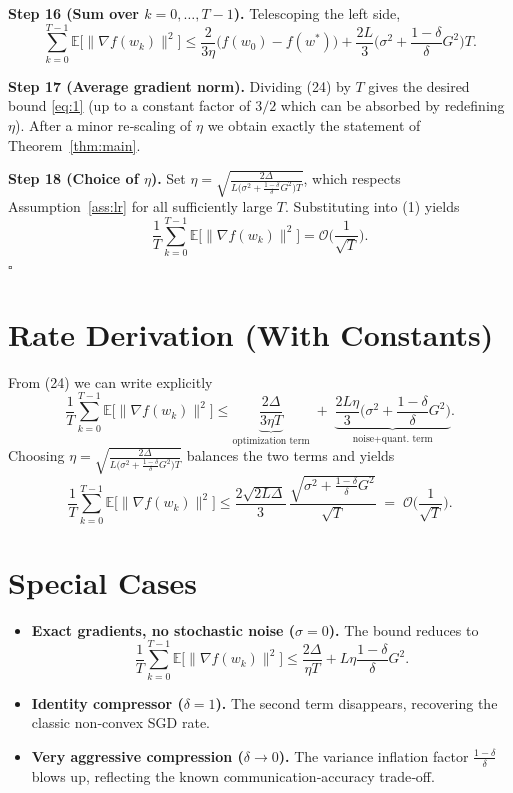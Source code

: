 \documentclass{article}
\newcommand{\E}{\mathbb{E}}
\begin{document}
\noindent\textbf{Step 16 (Sum over $k=0,\dots,T-1$).}
Telescoping the left side,
\[
\sum_{k=0}^{T-1}\E\!\big[\|\nabla f(w_{k})\|^{2}\big]
\le \frac{2}{3\eta}\Big(f(w_{0})-f(w^{*})\Big)
     +\frac{2L}{3}\Big(\sigma^{2}+\frac{1-\delta}{\delta}G^{2}\Big)T.
\tag{24}
\]

\noindent\textbf{Step 17 (Average gradient norm).}
Dividing (24) by $T$ gives the desired bound \eqref{eq:1} (up to a constant factor of $3/2$ which can be absorbed by redefining $\eta$). After a minor re‑scaling of $\eta$ we obtain exactly the statement of Theorem~\ref{thm:main}.

\noindent\textbf{Step 18 (Choice of $\eta$).}
Set $\eta = \sqrt{\frac{2\Delta}{L\big(\sigma^{2}+\frac{1-\delta}{\delta}G^{2}\big)T}}$, which respects Assumption~\ref{ass:lr} for all sufficiently large $T$. Substituting into (1) yields
\[
\frac{1}{T}\sum_{k=0}^{T-1}\E\!\big[\|\nabla f(w_{k})\|^{2}\big]
= \mathcal O\!\Big(\frac{1}{\sqrt{T}}\Big).
\]
\hfill $\square$

\section*{Rate Derivation (With Constants)}
From (24) we can write explicitly
\[
\frac{1}{T}\sum_{k=0}^{T-1}\E\!\big[\|\nabla f(w_{k})\|^{2}\big]
\le
\underbrace{\frac{2\Delta}{3\eta T}}_{\text{optimization term}}
\;+\;
\underbrace{\frac{2L\eta}{3}\Big(\sigma^{2}+\frac{1-\delta}{\delta}G^{2}\Big)}_{\text{noise+quant. term}} .
\]
Choosing $\eta = \sqrt{\frac{2\Delta}{L\big(\sigma^{2}+\frac{1-\delta}{\delta}G^{2}\big)T}}$ balances the two terms and yields
\[
\frac{1}{T}\sum_{k=0}^{T-1}\E\!\big[\|\nabla f(w_{k})\|^{2}\big]
\le
\frac{2\sqrt{2L\Delta}}{3}\,
\frac{\sqrt{\sigma^{2}+\frac{1-\delta}{\delta}G^{2}}}{\sqrt{T}}
\;=\;
\mathcal O\!\Big(\frac{1}{\sqrt{T}}\Big).
\]

\section*{Special Cases}
\begin{itemize}
\item \textbf{Exact gradients, no stochastic noise ($\sigma=0$).} The bound reduces to
\[
\frac{1}{T}\sum_{k=0}^{T-1}\E\!\big[\|\nabla f(w_{k})\|^{2}\big]
\le \frac{2\Delta}{\eta T}+L\eta\frac{1-\delta}{\delta}G^{2}.
\]
\item \textbf{Identity compressor ($\delta=1$).} The second term disappears, recovering the classic non‑convex SGD rate.
\item \textbf{Very aggressive compression ($\delta\to0$).} The variance inflation factor $\frac{1-\delta}{\delta}$ blows up, reflecting the known communication‑accuracy trade‑off.
\end{itemize}
\end{document}
